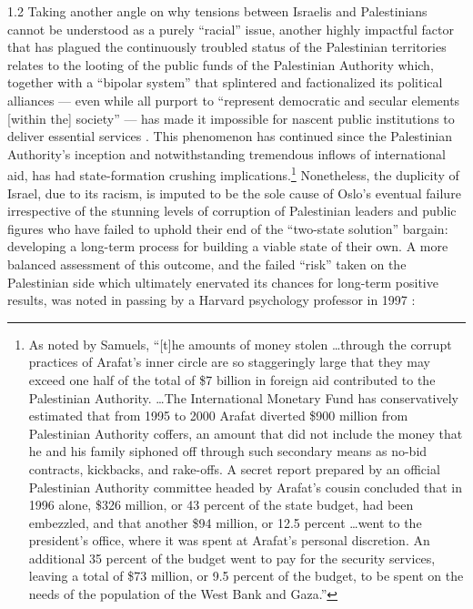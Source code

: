 \documentclass[../unravbook.tex]{subfiles}
\begin{document}
\begin{spacing}{1.2}
Taking another angle on why tensions between Israelis and Palestinians cannot be understood as a purely \enquote{racial} issue, another highly impactful factor that has plagued the continuously troubled status of the Palestinian territories relates to the looting of the public funds of the Palestinian Authority which, together with a ``bipolar system'' that splintered and factionalized its political alliances --- even while all purport to \enquote{represent democratic and secular elements [within the] society} \parencite[10]{Shafi-2004} --- has made it impossible for nascent public institutions to deliver essential services \parencite {Samuels-2005}. This phenomenon has continued since the Palestinian Authority's inception and notwithstanding tremendous inflows of international aid, has had state-formation crushing implications.\footnote{As noted by Samuels, \enquote{[t]he amounts of money stolen \ldots through the corrupt practices of Arafat's inner circle are so staggeringly large that they may exceed one half of the total of \$7 billion in foreign aid contributed to the Palestinian Authority. \ldots The International Monetary Fund has conservatively estimated that from 1995 to 2000 Arafat diverted \$900 million from Palestinian Authority coffers, an amount that did not include the money that he and his family siphoned off through such secondary means as no-bid contracts, kickbacks, and rake-offs. A secret report prepared by an official Palestinian Authority committee headed by Arafat's cousin concluded that in 1996 alone, \$326 million, or 43 percent of the state budget, had been embezzled, and that another \$94 million, or 12.5 percent \ldots went to the president's office, where it was spent at Arafat's personal discretion. An additional 35 percent of the budget went to pay for the security services, leaving a total of \$73 million, or 9.5 percent of the budget, to be spent on the needs of the population of the West Bank and Gaza.}} Nonetheless, the duplicity of Israel, due to its racism, is imputed to be the sole cause of Oslo's eventual failure irrespective of the stunning levels of corruption of Palestinian leaders and public figures who have failed to uphold their end of the \enquote{two-state solution} bargain: developing a long-term process for building a viable state of their own. A more balanced assessment of this outcome, and the failed \enquote{risk} taken on the Palestinian side which ultimately enervated its chances for long-term positive results, was noted in passing by a Harvard psychology professor in 1997 \parencite[194]{Kelman-1997}:


\end{spacing}
\end{document}
